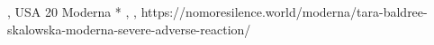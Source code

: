           {
            , USA
          }
          {
            20
          }
          {
            Moderna
          }
          {
            *
          }
          {
            ,
            ,
          }
          {
            https://nomoresilence.world/moderna/tara-baldree-skalowska-moderna-severe-adverse-reaction/
          }

